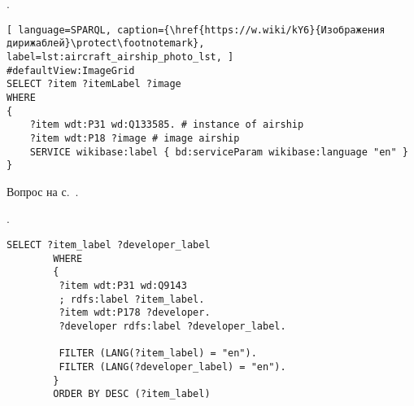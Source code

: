 \begin{task}
    \label{answer:aircraft_question_airship_2}
    . 
    
	\begin{lstlisting}[ language=SPARQL, caption={\href{https://w.wiki/kY6}{Изображения дирижаблей}\protect\footnotemark}, label=lst:aircraft_airship_photo_lst, ]
#defaultView:ImageGrid
SELECT ?item ?itemLabel ?image
WHERE
{
    ?item wdt:P31 wd:Q133585. # instance of airship
  	?item wdt:P18 ?image # image airship
    SERVICE wikibase:label { bd:serviceParam wikibase:language "en" }
}
\end{lstlisting}
    
    \small{Вопрос на с.~\pageref{aircraft_question_5}.}
\end{task}


\begin{task}
    \label{answer:prog_lang_1}
    . 
	\begin{lstlisting}[language=SPARQL, caption={{Создатели языков программирования}\protect\footnotemark}, label=lst:prog_lang_answer_1]
		SELECT ?item_label ?developer_label
		WHERE
		{
		 ?item wdt:P31 wd:Q9143
		 ; rdfs:label ?item_label. 
		 ?item wdt:P178 ?developer.
		 ?developer rdfs:label ?developer_label.
		 
		 FILTER (LANG(?item_label) = "en"). 
		 FILTER (LANG(?developer_label) = "en"). 
		}
		ORDER BY DESC (?item_label)
	\end{lstlisting}
\end{task}

